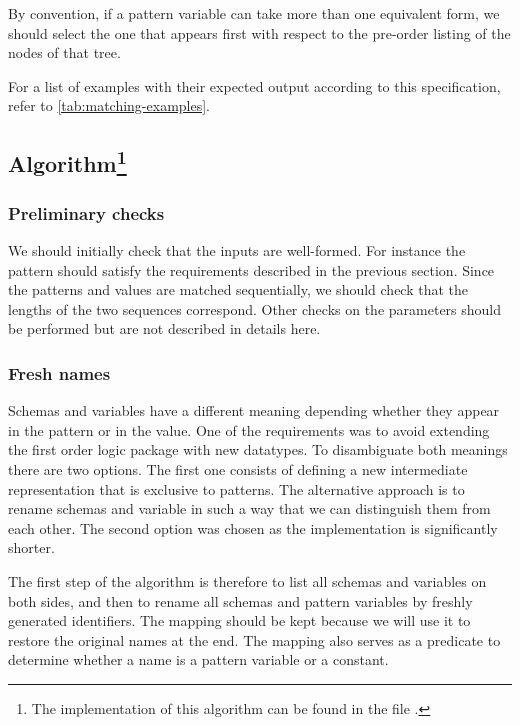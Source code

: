 By convention, if a pattern variable can take more than one equivalent form, we should select the one that appears first with respect to the pre-order listing of the nodes of that tree.

For a list of examples with their expected output according to this specification, refer to \autoref{tab:matching-examples}.

\subsection{Algorithm\texorpdfstring{\footnote{The implementation of this algorithm can be found in the file \href{https://github.com/FlorianCassayre/master-project/blob/master/src/main/scala/me/cassayre/florian/masterproject/front/proof/unification/UnificationUtils.scala}{}.}}{Lg}}

\subsubsection{Preliminary checks}

We should initially check that the inputs are well-formed. For instance the pattern should satisfy the requirements described in the previous section. Since the patterns and values are matched sequentially, we should check that the lengths of the two sequences correspond. Other checks on the parameters should be performed but are not described in details here.

\subsubsection{Fresh names}

Schemas and variables have a different meaning depending whether they appear in the pattern or in the value. One of the requirements was to avoid extending the first order logic package with new datatypes. To disambiguate both meanings there are two options. The first one consists of defining a new intermediate representation that is exclusive to patterns. The alternative approach is to rename schemas and variable in such a way that we can distinguish them from each other. The second option was chosen as the implementation is significantly shorter.

The first step of the algorithm is therefore to list all schemas and variables on both sides, and then to rename all schemas and pattern variables by freshly generated identifiers. The mapping should be kept because we will use it to restore the original names at the end. The mapping also serves as a predicate to determine whether a name is a pattern variable or a constant.

